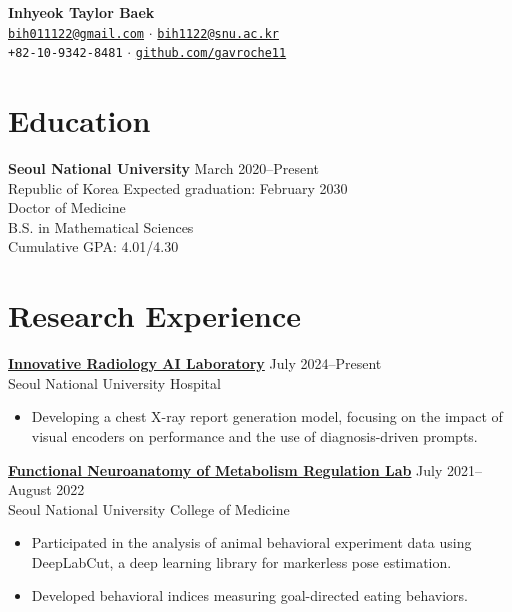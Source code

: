 \documentclass[10pt, a4paper]{article}
\newenvironment{customitemize}
	{\begin{itemize}[leftmargin=*, noitemsep, topsep=0pt, label=$\cdot$]}
	{\end{itemize}}
\begin{document}
\begin{center}
    {\Large\textbf{\color{headercolor}Inhyeok Taylor Baek}} \\[2mm]
    \small
    \faEnvelope\hspace{1mm}\href{mailto:bih011122@gmail.com}{\texttt{bih011122@gmail.com}} 
    \hspace{2mm}$\cdot$\hspace{2mm}
    \href{mailto:bih1122@snu.ac.kr}{\texttt{bih1122@snu.ac.kr}} \\[1mm]
    \faPhone\hspace{1mm}\texttt{+82-10-9342-8481}
    \hspace{2mm}$\cdot$\hspace{2mm}
    \faGithub\hspace{1mm}\href{https://github.com/gavroche11}{\texttt{github.com/gavroche11}}
\end{center}

\section*{Education}
\textbf{Seoul National University} \hfill March 2020--Present \\
Republic of Korea \hfill Expected graduation: February 2030 \smallskip\\
Doctor of Medicine\\
B.S. in Mathematical Sciences \smallskip\\
Cumulative GPA: 4.01/4.30

\section*{Research Experience}
\textbf{\href{http://irail.snu.ac.kr}{Innovative Radiology AI Laboratory}} \hfill July 2024--Present\\
Seoul National University Hospital \smallskip
\begin{customitemize}
    \item Developing a chest X-ray report generation model, focusing on the impact of visual encoders on performance and the use of diagnosis-driven prompts.
\end{customitemize}
\bigskip
\textbf{\href{https://fnmr.snu.ac.kr/}{Functional Neuroanatomy of Metabolism Regulation Lab}} \hfill July 2021--August 2022\\
Seoul National University College of Medicine \smallskip
\begin{customitemize}
    \item Participated in the analysis of animal behavioral experiment data using DeepLabCut, a deep learning library for markerless pose estimation.
    \item Developed behavioral indices measuring goal-directed eating behaviors.
\end{customitemize}
\end{document}

